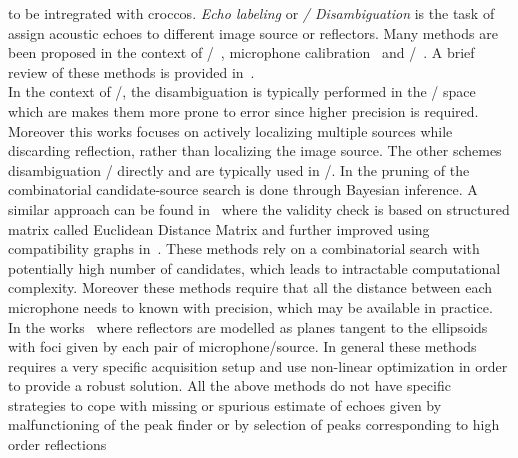  to be intregrated with croccos.
\textit{Echo labeling} or \textit{\TOA/ Disambiguation} is the task of assign acoustic echoes to different image source or reflectors.
Many methods are been proposed in the context of \SSL/~, microphone calibration~
and \RooGE/~.
A brief review of these methods is provided in~.
\\In the context of \SSL/, the disambiguation is typically performed in the \TDOAs/ space~ which are makes them more prone to error since higher precision is required.
Moreover this works focuses on actively localizing multiple sources while discarding reflection, rather than localizing the image source.
The other schemes disambiguation \TOAs/ directly and are typically used in \RooGE/.
In  the pruning of the combinatorial candidate-source search is done through Bayesian inference.
A similar approach can be found in~ where the validity check is based on structured matrix called Euclidean Distance Matrix and further improved using compatibility graphs in~.
These methods rely on a combinatorial search with potentially high number of candidates, which leads to intractable computational complexity.
Moreover these methods require that all the distance between each microphone needs to known with precision, which may be available in practice.
\\In the works~ where reflectors are modelled as planes tangent to the ellipsoids with foci given by each pair of microphone/source.
In general these methods requires a very specific acquisition setup and use non-linear optimization in order to provide a robust solution.
All the above methods do not have specific strategies to cope with missing or spurious estimate of echoes given by malfunctioning of the peak finder or by selection of peaks corresponding to high order reflections
